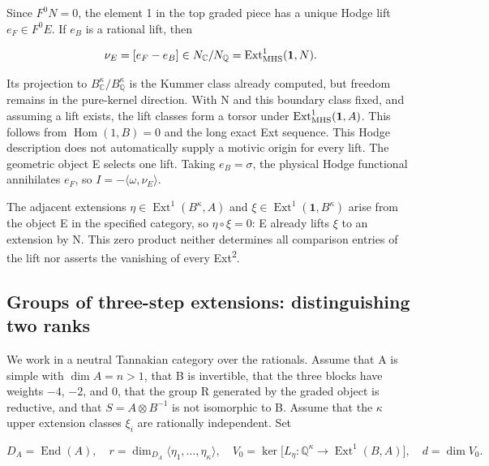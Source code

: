 \documentclass[11pt,a4paper,oneside]{article}
\theoremstyle{plain}
\theoremstyle{definition}
\theoremstyle{remark}
\numberwithin{equation}{section}
\begin{document}
Since \(F^0N=0\), the element 1 in the top graded piece has a unique Hodge lift \(e_F\in F^0E\). If \(e_B\) is a rational lift, then

\begin{equation}
\nu_E=[e_F-e_B]\in N_{\mathbb C}/N_{\mathbb Q}
       =\operatorname{Ext}^1_{\rm MHS}(\mathbf1,N).
\end{equation}

Its projection to \(B^\kappa_{\mathbb C}/B^\kappa_{\mathbb Q}\) is the Kummer class already computed, but freedom remains in the pure-kernel direction. With N and this boundary class fixed, and assuming a lift exists, the lift classes form a torsor under \(\operatorname{Ext}^1_{\rm MHS}(\mathbf1,A)\). This follows from \(\operatorname{Hom}(1,B)=0\) and the long exact Ext sequence. This Hodge description does not automatically supply a motivic origin for every lift. The geometric object E selects one lift. Taking \(e_B=\sigma\), the physical Hodge functional annihilates \(e_F\), so \(I=-\langle\omega,\nu_E\rangle\).

The adjacent extensions \(\eta\in\operatorname{Ext}^1(B^\kappa,A)\) and \(\xi\in\operatorname{Ext}^1(\mathbf1,B^\kappa)\) arise from the object E in the specified category, so \(\eta\circ\xi=0\): E already lifts \(\xi \) to an extension by N. This zero product neither determines all comparison entries of the lift nor asserts the vanishing of every Ext\textsuperscript{2}.


\subsection{Groups of three-step extensions: distinguishing two ranks}\label{sec:core:6}

We work in a neutral Tannakian category over the rationals. Assume that A is simple with \(\dim A=n>1\), that B is invertible, that the three blocks have weights \(- 4\), \(- 2\), and 0, that the group R generated by the graded object is reductive, and that \(S=A\otimes B^{-1}\) is not isomorphic to B. Assume that the \(\kappa \) upper extension classes \(\xi _i\) are rationally independent. Set

\begin{equation}
D_A=\operatorname{End}(A),\quad
 r=\dim_{D_A}\langle\eta_1,\ldots,\eta_\kappa\rangle,
 \quad V_0=\ker\bigl[L_\eta:\mathbb Q^\kappa\to
             \operatorname{Ext}^1(B,A)\bigr],\quad d=\dim V_0.  \label{eq:core:6.1}
\end{equation}
\end{document}
